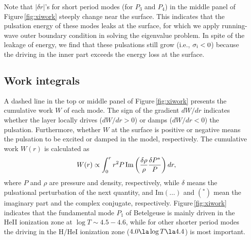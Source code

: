 \documentclass[fleqn,usenatbib]{mnras}
\begin{document}
Note that $|\delta r|$'s for short period modes (for $P_3$ and $P_4$) in the 
middle panel of Figure\,\ref{fig:xiwork} steeply change near the surface.
This indicates that the pulsation energy of these modes leaks 
at the surface, for which we apply running-wave outer boundary condition
in solving the eigenvalue problem.
In spite of the leakage of energy, we find that these pulsations 
still grow (i.e., $\sigma_{\rm i} < 0$) because the driving in the inner part
exceeds the energy loss at the surface.

\subsection{Work integrals}
A dashed line in the top or middle panel of Figure\,\ref{fig:xiwork}  
presents the cumulative work $W$ of each mode. 
The sign of the gradient $dW/dr$ indicates whether the layer locally 
drives ($dW/dr>0$) or damps ($dW/dr<0$) the pulsation.  
Furthermore, whether $W$ at the surface is positive or negative means
the pulsation to be excited or damped in the model, respectively. 
The cumulative work $W(r)$ is calculated as \citep[e.g.,][]{SaioCox1980} 
\begin{equation}
W(r) \propto \int_0^r r^2P\,{\rm Im}\left({\delta\rho\over\rho}{\delta P^*\over P}\right) dr,
\label{eq:work}
\end{equation}
where $P$ and $\rho$ are pressure and density, respectively, while $\delta$ means
 the  pulsational perturbation of the next quantity, and Im$(\ldots)$ and $(^*)$ 
 mean the imaginary part and the complex conjugate, respectively. 
Figure\,\ref{fig:xiwork} indicates that the fundamental mode $P_1$ 
of Betelgeuse is mainly driven in the HeII ionization zone at $\log T\sim4.5-4.6$,
while for other shorter period modes the driving in the H/HeI ionization zone  
($4.0\la\log T\la4.4$) is most important.  
\end{document}
